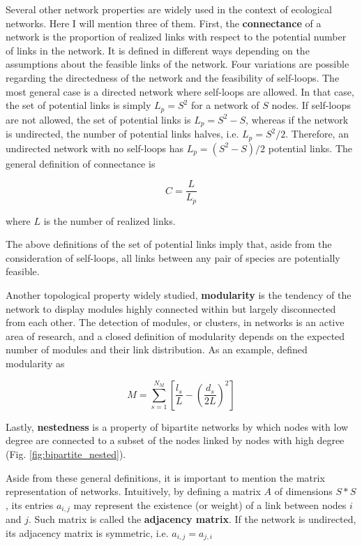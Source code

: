 Several other network properties are widely used in the context of ecological networks. Here I will mention three of them. First, the \textbf{connectance} of a network is the proportion of realized links with respect to the potential number of links in the network. It is defined in different ways depending on the assumptions about the feasible links of the network. Four variations are possible regarding the directedness of the network and the feasibility of self-loops. The most general case is a directed network where self-loops are allowed. In that case, the set of potential links is simply $L_p = S^2$ for a network of $S$ nodes. If self-loops are not allowed, the set of potential links is $L_p = S^2 - S$, whereas if the network is undirected, the number of potential links halves, i.e. $L_p = S^2/2$. Therefore, an undirected network with no self-loops has $L_p = (S^2 - S)/2$ potential links. The general definition of connectance is

\begin{equation}
C = \frac{L}{L_p}
\end{equation}

where $L$ is the number of realized links.

The above definitions of the set of potential links imply that, aside from the consideration of self-loops, all links between any pair of species are potentially feasible.

Another topological property widely studied, \textbf{modularity} is the tendency of the network to display modules highly connected within but largely disconnected from each other. The detection of modules, or clusters, in networks is an active area of research, and a closed definition of modularity depends on the expected number of modules and their link distribution. As an example, \cite{Fortuna2010} defined modularity as

\begin{equation}
M = \sum_{s = 1}^{N_M} \left[\frac{l_s}{L} - \left(\frac{d_s}{2L}\right)^2\right]
\end{equation}

Lastly, \textbf{nestedness} is a property of bipartite networks by which nodes with low degree are connected to a subset of the nodes linked by nodes with high degree (Fig. \ref{fig:bipartite_nested}).

Aside from these general definitions, it is important to mention the matrix representation of networks. Intuitively, by defining a matrix $A$ of dimensions $S * S$, its entries $a_{i,j}$ may represent the existence (or weight) of a link between nodes $i$ and $j$. Such matrix is called the \textbf{adjacency matrix}. If the network is undirected, its adjacency matrix is symmetric, i.e. $a_{i,j} = a_{j,i}$

